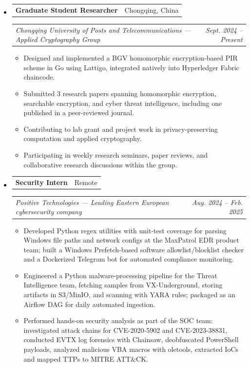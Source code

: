 \documentclass[11pt,letterpaper]{article}
\makeatletter
\newcommand{\headerrow}[2]
{\begin{tabular*}{\linewidth}{l@{\extracolsep{\fill}}r}
#1 & #2 \\
\end{tabular*}}
\makeatother
\begin{document}
\renewcommand\labelitemi{}
\renewcommand\labelitemii{$\bullet$}
\begin{itemize}[leftmargin=0em, itemsep=0.6em]
    \parskip=0.1em

    \item
    \headerrow
        {\textbf{Graduate Student Researcher}}
        {Chongqing, China}
    \headerrow
        {\emph{Chongqing University of Posts and Telecommunications --- Applied Cryptography Group}}
        {\emph{Sept. 2024 -- Present}}
    \begin{itemize}[leftmargin=1.2em, itemsep=0.1em]
        \renewcommand\labelitemi{$\bullet$}
        \item Designed and implemented a BGV homomorphic encryption-based PIR scheme in Go using Lattigo, integrated natively into Hyperledger Fabric chaincode.
        \item Submitted 3 research papers spanning homomorphic encryption, searchable encryption, and cyber threat intelligence, including one published in a peer-reviewed journal.
        \item Contributing to lab grant and project work in privacy-preserving computation and applied cryptography.
        \item Participating in weekly research seminars, paper reviews, and collaborative research discussions within the group.
    \end{itemize}

    \item
    \headerrow
        {\textbf{Security Intern}}
        {Remote}
    \headerrow
        {\emph{Positive Technologies --- Leading Eastern European cybersecurity company}}
        {\emph{Aug. 2024 -- Feb. 2025}}
    \begin{itemize}[leftmargin=1.2em, itemsep=0.1em]
        \renewcommand\labelitemi{$\bullet$}
        \item Developed Python regex utilities with unit-test coverage for parsing Windows file paths and network configs at the MaxPatrol EDR product team; built a Windows Prefetch-based software allowlist/blocklist checker and a Dockerized Telegram bot for automated compliance monitoring.
        \item Engineered a Python malware-processing pipeline for the Threat Intelligence team, fetching samples from VX-Underground, storing artifacts in S3/MinIO, and scanning with YARA rules; packaged as an Airflow DAG for daily automated ingestion.
        \item Performed hands-on security analysis as part of the SOC team: investigated attack chains for CVE-2020-5902 and CVE-2023-38831, conducted EVTX log forensics with Chainsaw, deobfuscated PowerShell payloads, analyzed malicious VBA macros with oletools, extracted IoCs and mapped TTPs to MITRE ATT\&CK.
    \end{itemize}


\end{itemize}
\end{document}
